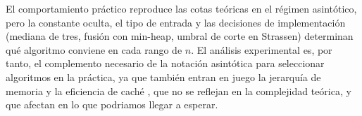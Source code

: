 El comportamiento práctico reproduce las cotas teóricas en el régimen
asintótico, pero la constante oculta, el tipo de entrada y las decisiones de
implementación (mediana de tres, fusión con min-heap, umbral de corte en
Strassen) determinan qué algoritmo conviene en cada rango de $n$. El análisis
experimental es, por tanto, el complemento necesario de la notación asintótica
para seleccionar algoritmos en la práctica, ya que también entran en juego la jerarquía de memoria y la eficiencia de caché 
, que no se reflejan en la complejidad teórica, y que afectan en lo que podriamos llegar a esperar.